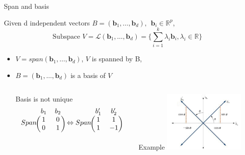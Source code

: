 \documentclass[ignorenonframetext,]{beamer}
\providecommand{\tightlist}{%
  \setlength{\itemsep}{0pt}\setlength{\parskip}{0pt}}
\begin{document}
\begin{frame}{Span and basis}

Given d independent vectors
\(B = (\mathbf{b}_1, \dots, \mathbf{b}_d), ~~\mathbf{b}_i \in \mathbb{R}^p\),
\[
\text{Subspace }V = \mathcal{L}(\mathbf{b}_1, \dots, \mathbf{b}_d) = \{\sum_{i = 1}^k\lambda_i\mathbf{b}_i, \lambda_i\in \mathbb{R}\}
\]

\begin{itemize}
\tightlist
\item
  \(V = span(\mathbf{b}_1, \dots, \mathbf{b}_d)\), \(V\) is spanned by
  B,\\
\item
  \(B = (\mathbf{b}_1, \dots, \mathbf{b}_d)\) is a basis of \(V\)\\

  \begin{columns}
  \begin{column}{0.6\textwidth}
     \begin{block}{Basis is not unique}
  \[
    Span
  \begin{blockarray}{cc}
  b_1 & b_2  \\
  \begin{block}{(cc)}
    1 & 0 \\
    0 & 1 \\
  \end{block}
  \end{blockarray} \Leftrightarrow 
   Span
  \begin{blockarray}{cc}
  b'_1 & b'_2  \\
  \begin{block}{(cc)}
    1 & 1 \\
    1 & -1 \\
  \end{block}
  \end{blockarray}
    \]
     \end{block}
  \end{column}
  \begin{column}{0.4\textwidth}  %
  \begin{block}{Example}
  \includegraphics[height=3cm]{./pic/axes-rotation.jpg}
  \end{block}
  \end{column}
  \end{columns}
\end{itemize}

\end{frame}
\end{document}
